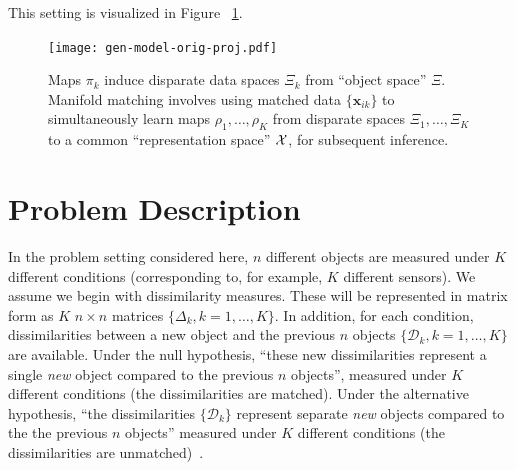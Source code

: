 \documentclass[12pt,oneside,final]{thesis}\usepackage[]{graphicx}\usepackage[]{color}
\begin{document}
 This setting is visualized in  Figure ~\ref{fig:multisensor}.

\begin{figure}
  \begin{center}
\texttt{[image: gen-model-orig-proj.pdf]}
 \caption{Maps $\pi_k$ induce disparate data spaces $\Xi_k$ from ``object space'' $\Xi$.
    Manifold matching involves using matched data $\{\bm{x}_{ik}\}$
    to simultaneously learn maps $\rho_1,\ldots,\rho_K$
    from disparate spaces 
    $\Xi_1,\ldots,\Xi_K$
  to a common ``representation space'' $\mathcal{X}$, for subsequent inference.}\label{fig:mm}
  \end{center}
  \label{fig:multisensor}
\end{figure}

\section{Problem Description}
In the problem setting considered here,  $n$ different objects are measured under $K$ different conditions (corresponding  to, for example, $K$ different sensors). We assume we begin with dissimilarity measures. These will be represented in matrix form as $K$ $n \times n$ matrices $\{\Delta_k,k=1 ,\ldots,K\}$.  In addition, for each condition, dissimilarities between  a new object  and the previous 
$n$ objects $\{\mathcal{D}_k,k=1 ,\ldots,K\}$ are available. Under  the null hypothesis, ``these new dissimilarities represent a single \emph{new} object  compared to the previous $n$ objects'', measured under $K$ different conditions (the dissimilarities are matched). Under the alternative hypothesis, ``the dissimilarities $\{\mathcal{D}_k\}$ represent separate \emph{new} objects compared to the the previous $n$ objects''  measured under $K$ different conditions (the dissimilarities are unmatched)~\cite{JOFC}. %
\end{document}
